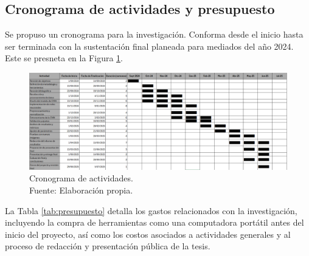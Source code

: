 \begin{landscape}
	\section{Cronograma de actividades y presupuesto}
	Se propuso un cronograma para la investigación. Conforma desde el inicio hasta ser terminada con la sustentación final planeada para mediados del año 2024. Este se presneta en la Figura \ref{3:fig6}.

	\begin{figure}[!ht]
		\begin{center}
			\includegraphics[width=1.50\textwidth]{3/figures/gant.png}
			\caption[Cronograma de actividades]{Cronograma de actividades.\\
				Fuente: Elaboración propia.}
			\label{3:fig6}
		\end{center}
	\end{figure}
	
\end{landscape}




La Tabla \ref{tab:presupuesto} detalla los gastos relacionados con la investigación, incluyendo la compra de herramientas como una computadora portátil antes del inicio del proyecto, así como los costos asociados a actividades generales y al proceso de redacción y presentación pública de la tesis.

